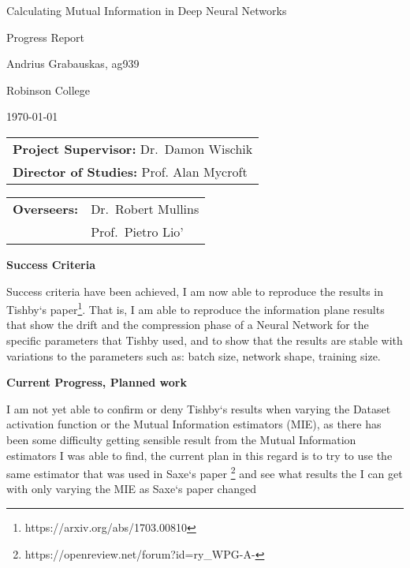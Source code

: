 \documentclass[11pt]{article}
\begin{document}
\thispagestyle{empty}

\centerline{\large Calculating Mutual Information in Deep Neural Networks}
\centerline{\large Progress Report}
\vspace{0.2in}

\centerline{Andrius Grabauskas, ag939}
\centerline{Robinson College}
\centerline{\today}

\vspace{0.2in}


\begin{tabular}[t]{@{}l}
{\bf Project Supervisor:} Dr.\ Damon Wischik \\[3mm]
{\bf Director of Studies:} Prof. Alan Mycroft
\end{tabular}
\hfill
\begin{tabular}[t]{@{}l @{}l}
{\bf Overseers: } & Dr.\ Robert Mullins \\[3mm] 
& Prof.\ Pietro Lio'
\end{tabular}

\vspace{0.3in}

\large{\bf Success Criteria}

  Success criteria have been achieved, I am now able to reproduce the results in
  Tishby`s paper\footnote{https://arxiv.org/abs/1703.00810}. That is, I am able
  to reproduce the information plane results that show the drift and the
  compression phase of a Neural Network for the specific parameters that Tishby
  used, and to show that the results are stable with variations to the parameters
  such as: batch size, network shape, training size. 


\large{\bf Current Progress, Planned work}

  I am not yet able to confirm or deny Tishby`s results when varying the Dataset
  activation function or the Mutual Information estimators (MIE), as there has
  been some difficulty getting sensible result from the Mutual Information
  estimators I was able to find, the current plan in this regard is to try to
  use the same estimator that was used in Saxe`s paper
  \footnote{https://openreview.net/forum?id=ry\_WPG-A-} and see what results the
  I can get with only varying the MIE as Saxe`s paper changed 
  
\end{document}
